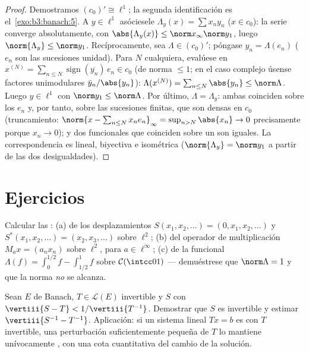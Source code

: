 \begin{proof}
Demostramos $(c_0)' \cong \ell^1$; la segunda identificación es
el~\cref{exo:b3:banach:5}. A $y \in \ell^1$ asóciesele $\Lambda_y(x)
= \sum x_ny_n$ ($x \in c_0$): la serie converge absolutamente, con
$\abs{\Lambda_y(x)} \leq \norm x_\infty\norm y_1$, luego
$\norm{\Lambda_y} \leq \norm y_1$. Recíprocamente, sea $\Lambda \in
(c_0)'$; póngase $y_n = \Lambda(e_n)$ ($e_n$ son las sucesiones unidad).
Para $N$ cualquiera, evalúese en $x^{(N)} = \sum_{n \leq N}
\operatorname{sign}(\overline{y_n})\,e_n \in c_0$ (de norma $\leq
1$; en el caso complejo úsense factores unimodulares $\bar y_n/\abs
{y_n}$): $\Lambda(x^{(N)}) = \sum_{n\leq N}\abs{y_n} \leq
\norm\Lambda$. Luego $y \in \ell^1$ con $\norm y_1 \leq
\norm\Lambda$. Por último, $\Lambda = \Lambda_y$: ambas coinciden sobre
los $e_n$ y, por tanto, sobre las sucesiones finitas, que son densas en
$c_0$ (truncamiento:
$\norm{x - \sum_{n \leq N}x_ne_n}_\infty = \sup_{n > N}\abs{x_n}
\to 0$ precisamente porque $x_n \to 0$); y dos funcionales
 que coinciden sobre un
 son iguales. La
correspondencia es lineal, biyectiva e isométrica
($\norm{\Lambda_y} = \norm y_1$ a partir de las dos desigualdades).
\end{proof}

\section{Ejercicios}

\begin{exercise}[$\star$]\label{exo:b3:banach:1}
Calcular las : (a) de
los desplazamientos $S(x_1, x_2, \dots) = (0, x_1, x_2, \dots)$ y
$S^*(x_1, x_2, \dots) = (x_2, x_3, \dots)$ sobre $\ell^2$; (b) del
operador de multiplicación $M_a x = (a_nx_n)$ sobre $\ell^2$, para
$a \in \ell^\infty$; (c) de la funcional $\Lambda(f) = \int_0^{1/2}f -
\int_{1/2}^1f$ sobre $\mathcal C(\intcc01)$ --- demuéstrese que
$\norm\Lambda = 1$ y que la norma \emph{no} se alcanza.
\end{exercise}

\begin{exercise}[$\star$]\label{exo:b3:banach:2}
Sean $E$ de Banach, $T \in \mathcal L(E)$ invertible y $S$ con
$\vertiii{S - T} < 1/\vertiii{T^{-1}}$. Demostrar que $S$ es invertible
y estimar $\vertiii{S^{-1} - T^{-1}}$. Aplicación: si un sistema lineal
$Tx = b$ es  con $T$
invertible, una perturbación suficientemente pequeña de $T$ lo mantiene
unívocamente , con una cota
cuantitativa del cambio de la solución.
\end{exercise}

